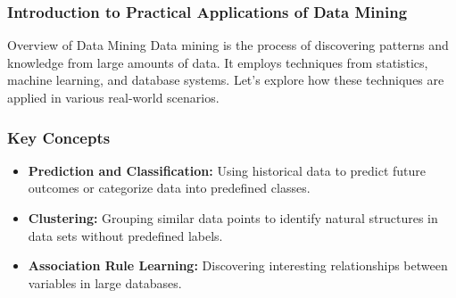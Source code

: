 \documentclass[aspectratio=169]{beamer}
\begin{document}
\frame{\titlepage}

\begin{frame}[fragile]
    \frametitle{Introduction to Practical Applications of Data Mining}
    
    \begin{block}{Overview of Data Mining}
        Data mining is the process of discovering patterns and knowledge from large amounts of data. It employs techniques from statistics, machine learning, and database systems. Let's explore how these techniques are applied in various real-world scenarios.
    \end{block}
\end{frame}

\begin{frame}[fragile]
    \frametitle{Key Concepts}
    
    \begin{itemize}
        \item \textbf{Prediction and Classification:} 
            Using historical data to predict future outcomes or categorize data into predefined classes.
        \item \textbf{Clustering:} 
            Grouping similar data points to identify natural structures in data sets without predefined labels.
        \item \textbf{Association Rule Learning:} 
            Discovering interesting relationships between variables in large databases.
    \end{itemize}
\end{frame}
\end{document}
